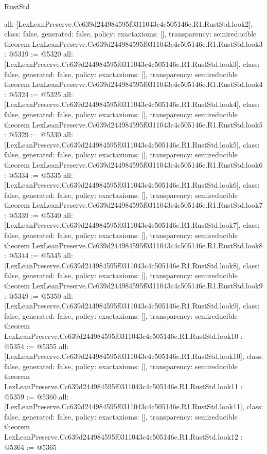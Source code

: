 \begin{lexlean}{RustStd}
\begin{coremodule}
{  all: [LexLeanPreserve.Cc639d244984595f0311043c4c505146e.R1.RustStd.look2],
  class: false,
  generated: false,
  policy: exact{axioms: []},
  transparency: semireducible
}
theorem LexLeanPreserve.Cc639d244984595f0311043c4c505146e.R1.RustStd.look3 : @5319 := @5320 {
  all: [LexLeanPreserve.Cc639d244984595f0311043c4c505146e.R1.RustStd.look3],
  class: false,
  generated: false,
  policy: exact{axioms: []},
  transparency: semireducible
}
theorem LexLeanPreserve.Cc639d244984595f0311043c4c505146e.R1.RustStd.look4 : @5324 := @5325 {
  all: [LexLeanPreserve.Cc639d244984595f0311043c4c505146e.R1.RustStd.look4],
  class: false,
  generated: false,
  policy: exact{axioms: []},
  transparency: semireducible
}
theorem LexLeanPreserve.Cc639d244984595f0311043c4c505146e.R1.RustStd.look5 : @5329 := @5330 {
  all: [LexLeanPreserve.Cc639d244984595f0311043c4c505146e.R1.RustStd.look5],
  class: false,
  generated: false,
  policy: exact{axioms: []},
  transparency: semireducible
}
theorem LexLeanPreserve.Cc639d244984595f0311043c4c505146e.R1.RustStd.look6 : @5334 := @5335 {
  all: [LexLeanPreserve.Cc639d244984595f0311043c4c505146e.R1.RustStd.look6],
  class: false,
  generated: false,
  policy: exact{axioms: []},
  transparency: semireducible
}
theorem LexLeanPreserve.Cc639d244984595f0311043c4c505146e.R1.RustStd.look7 : @5339 := @5340 {
  all: [LexLeanPreserve.Cc639d244984595f0311043c4c505146e.R1.RustStd.look7],
  class: false,
  generated: false,
  policy: exact{axioms: []},
  transparency: semireducible
}
theorem LexLeanPreserve.Cc639d244984595f0311043c4c505146e.R1.RustStd.look8 : @5344 := @5345 {
  all: [LexLeanPreserve.Cc639d244984595f0311043c4c505146e.R1.RustStd.look8],
  class: false,
  generated: false,
  policy: exact{axioms: []},
  transparency: semireducible
}
theorem LexLeanPreserve.Cc639d244984595f0311043c4c505146e.R1.RustStd.look9 : @5349 := @5350 {
  all: [LexLeanPreserve.Cc639d244984595f0311043c4c505146e.R1.RustStd.look9],
  class: false,
  generated: false,
  policy: exact{axioms: []},
  transparency: semireducible
}
theorem LexLeanPreserve.Cc639d244984595f0311043c4c505146e.R1.RustStd.look10 : @5354 := @5355 {
  all: [LexLeanPreserve.Cc639d244984595f0311043c4c505146e.R1.RustStd.look10],
  class: false,
  generated: false,
  policy: exact{axioms: []},
  transparency: semireducible
}
theorem LexLeanPreserve.Cc639d244984595f0311043c4c505146e.R1.RustStd.look11 : @5359 := @5360 {
  all: [LexLeanPreserve.Cc639d244984595f0311043c4c505146e.R1.RustStd.look11],
  class: false,
  generated: false,
  policy: exact{axioms: []},
  transparency: semireducible
}
theorem LexLeanPreserve.Cc639d244984595f0311043c4c505146e.R1.RustStd.look12 : @5364 := @5365 {
}
\end{coremodule}
\end{lexlean}
